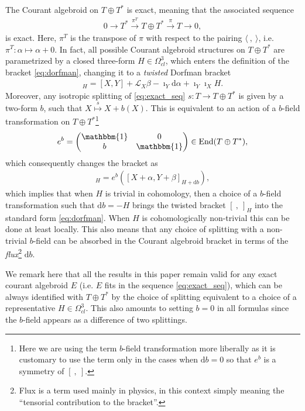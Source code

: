 \documentclass{article}
\newcommand{\TT}{{T\oplus T^*}}
\newcommand{\id}{\mathbbm{1}}
\newcommand{\Lie}{\mathcal{L}}
\newcommand{\ap}{\alpha}
\newcommand{\bt}{\beta}
\newcommand{\rd}{\mathrm{d}}
\newcommand{\la}{\langle}
\newcommand{\ra}{\rangle}
\newcommand{\lara}{\la\ ,\ \ra}
\newcommand{\brac}{[\ ,\ ]}
\theoremstyle{definition}
\theoremstyle{definition}
\theoremstyle{remark}
\DeclareMathOperator{\End}{End}
\begin{document}
The Courant algebroid on $\TT$ is exact, meaning that the associated sequence
\begin{align}\label{eq:exact_seq}
0\longrightarrow T^* \overset{\pi^T}{\longrightarrow} \TT\overset{\pi}{\longrightarrow} T\longrightarrow 0,
\end{align}
is exact. Here, $\pi^T$ is the transpose of $\pi$ with respect to the pairing $\lara$,
i.e. $\pi^T: \ap \mapsto \ap+0$. In fact, all possible Courant algebroid structures on $\TT$ are parametrized by a closed three-form $H\in \Omega^3_{cl}$, which enters the definition of the bracket \eqref{eq:dorfman}, changing it to a {\it twisted} Dorfman bracket
\begin{align*}
[ X+\ap,Y+\bt]_H=[X,Y]+\Lie_X\bt-\imath_Y\rd \ap+\imath_Y\imath_X H.
\end{align*}
Moreover, any isotropic splitting of \eqref{eq:exact_seq} $s:T\rightarrow \TT$ is given by a two-form $b$, such that $X\overset{s}{\mapsto}X+b(X)$. This is equivalent to an action of a $b$-field transformation on $\TT$\footnote{Here we are using the term $b$-field transformation more liberally as it is customary to use the term only in the cases when $\rd b=0$ so that $e^b$ is a symmetry of $\brac$.}
\begin{align*}
e^b=
\begin{pmatrix}
\id & 0 \\
b & \id
\end{pmatrix}
\in \End(\TT),
\end{align*}
which consequently changes the bracket as
\begin{align*}
[ e^b(X+\ap),e^b(Y+\bt)]_H=e^b([ X+\ap,Y+\bt]_{H+\rd b}),
\end{align*}
which implies that when $H$ is trivial in cohomology, then a choice of a $b$-field transformation such that $\rd b=-H$ brings the twisted bracket $\brac_H$ into the standard form \eqref{eq:dorfman}. When $H$ is cohomologically non-trivial this can be done at least locally. This also means that any choice of splitting with a non-trivial $b$-field can be absorbed in the Courant algebroid bracket in terms of the {\it flux}\footnote{Flux is a term used mainly in physics, in this context simply meaning the ``tensorial contribution to the bracket''.} $\rd b$.

We remark here that all the results in this paper remain valid for any exact courant algebroid $E$ (i.e. $E$ fits in the sequence \eqref{eq:exact_seq}), which can be always identified with $\TT$ by the choice of splitting equivalent to a choice of a representative $H\in\Omega^3_{cl}$. This also amounts to setting $b=0$ in all formulas since the $b$-field appears as a difference of two splittings.
\end{document}

